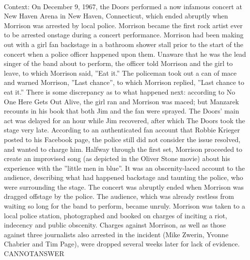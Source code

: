 \documentclass[11pt,a4paper, onecolumn]{article}
\begin{document}
\\ Context: On December 9, 1967, the Doors performed a now infamous concert at New Haven Arena in New Haven, Connecticut, which ended abruptly when Morrison was arrested by local police. Morrison became the first rock artist ever to be arrested onstage during a concert performance. Morrison had been making out with a girl fan backstage in a bathroom shower stall prior to the start of the concert when a police officer happened upon them. Unaware that he was the lead singer of the band about to perform, the officer told Morrison and the girl to leave, to which Morrison said, ''Eat it.'' The policeman took out a can of mace and warned Morrison, ''Last chance'', to which Morrison replied, ''Last chance to eat it.'' There is some discrepancy as to what happened next: according to No One Here Gets Out Alive, the girl ran and Morrison was maced; but Manzarek recounts in his book that both Jim and the fan were sprayed. The Doors' main act was delayed for an hour while Jim recovered, after which The Doors took the stage very late. According to an authenticated fan account that Robbie Krieger posted to his Facebook page, the police still did not consider the issue resolved, and wanted to charge him. Halfway through the first set, Morrison proceeded to create an improvised song (as depicted in the Oliver Stone movie) about his experience with the ''little men in blue''. It was an obscenity-laced account to the audience, describing what had happened backstage and taunting the police, who were surrounding the stage. The concert was abruptly ended when Morrison was dragged offstage by the police. The audience, which was already restless from waiting so long for the band to perform, became unruly. Morrison was taken to a local police station, photographed and booked on charges of inciting a riot, indecency and public obscenity. Charges against Morrison, as well as those against three journalists also arrested in the incident (Mike Zwerin, Yvonne Chabrier and Tim Page), were dropped several weeks later for lack of evidence. CANNOTANSWER
\end{document}
